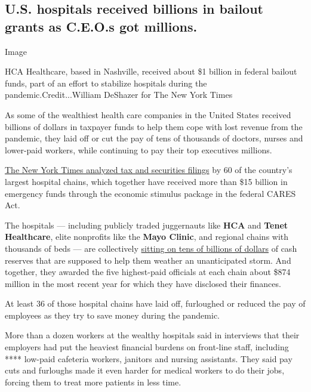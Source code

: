 \hypertarget{us-hospitals-received-billions-in-bailout-grants-as-ceos-got-millions}{%
\subsection{U.S. hospitals received billions in bailout grants as
C.E.O.s got
millions.}\label{us-hospitals-received-billions-in-bailout-grants-as-ceos-got-millions}}

Image

HCA Healthcare, based in Nashville, received about \$1 billion in
federal bailout funds, part of an effort to stabilize hospitals during
the pandemic.Credit...William DeShazer for The New York Times

As some of the wealthiest health care companies in the United States
received billions of dollars in taxpayer funds to help them cope with
lost revenue from the pandemic, they laid off or cut the pay of tens of
thousands of doctors, nurses and lower-paid workers, while continuing to
pay their top executives millions.

\href{https://www.nytimes3xbfgragh.onion/2020/06/08/business/hospitals-bailouts-ceo-pay.html}{The
New York Times analyzed tax and securities filings} by 60 of the
country's largest hospital chains, which together have received more
than \$15 billion in emergency funds through the economic stimulus
package in the federal CARES Act.

The hospitals --- including publicly traded juggernauts like
\textbf{HCA} and \textbf{Tenet Healthcare}, elite nonprofits like the
\textbf{Mayo Clinic}, and regional chains with thousands of beds --- are
collectively
\href{https://www.nytimes3xbfgragh.onion/2020/05/25/business/coronavirus-hospitals-bailout.html}{sitting
on tens of billions of dollars} of cash reserves that are supposed to
help them weather an unanticipated storm. And together, they awarded the
five highest-paid officials at each chain about \$874 million in the
most recent year for which they have disclosed their finances.

At least 36 of those hospital chains have laid off, furloughed or
reduced the pay of employees as they try to save money during the
pandemic.

More than a dozen workers at the wealthy hospitals said in interviews
that their employers had put the heaviest financial burdens on
front-line staff, including **** low-paid cafeteria workers, janitors
and nursing assistants. They said pay cuts and furloughs made it even
harder for medical workers to do their jobs, forcing them to treat more
patients in less time.

